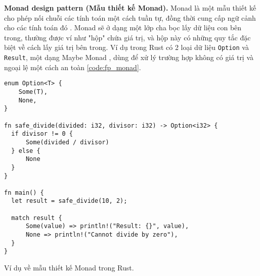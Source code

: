 
\textbf{Monad design pattern (Mẫu thiết kế Monad).} Monad là một mẫu thiết kế cho phép nối chuỗi các tính toán một cách tuần tự, đồng thời cung cấp ngữ cảnh cho các tính toán đó \cite{gill2015remote}.
Monad sẽ ở dạng một lớp cha bọc lấy dữ liệu con bên trong, thường được ví như "hộp" chứa giá trị, và hộp này có những quy tắc đặc biệt về cách lấy giá trị bên trong.
Ví dụ trong Rust có 2 loại dữ liệu \texttt{Option} và \texttt{Result}, một dạng Maybe Monad \cite{wikibooksHaskellUnderstandingMonadsMaybe}, dùng để xử lý trường hợp không có giá trị và ngoại lệ một cách an toàn \ref{code:fp_monad}.

\begin{listing}[H]
\begin{verbatim}
enum Option<T> {
    Some(T),
    None,
}

fn safe_divide(divided: i32, divisor: i32) -> Option<i32> {
  if divisor != 0 {
      Some(divided / divisor)
  } else {
      None
  }
}

fn main() {
  let result = safe_divide(10, 2);

  match result {
      Some(value) => println!("Result: {}", value),
      None => println!("Cannot divide by zero"),
  }
}
\end{verbatim}
\caption{Ví dụ về mẫu thiết kế Monad trong Rust.}
\label{code:fp_monad}
\end{listing}



